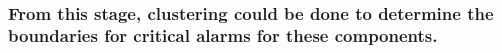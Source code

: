 \documentclass[11pt]{article}
\begin{document}
    \begin{center}
    \end{center}
    { \hspace*{\fill} \\}
    
    \subsubsection{From this stage, clustering could be done to determine
the boundaries for critical alarms for these
components.}\label{from-this-stage-clustering-could-be-done-to-determine-the-boundaries-for-critical-alarms-for-these-components.}


    
    
    
    
\end{document}
